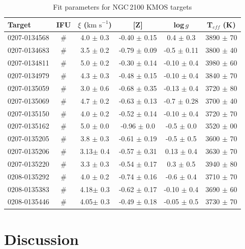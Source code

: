 \documentclass[useAMS,usenatbib]{mn2e}
\def\kms{$\mbox{km s}^{-1}$}
\begin{document}
\begin{table}
\begin{center}
\caption{
Fit parameters for NGC\,2100 KMOS targets
\label{tb:stellar-params}
         }
\scriptsize
\begin{tabular}{lc cccc}
 \hline
 \hline
  Target  & IFU & $\xi$ (\kms) & [Z] & log\,$g$ & T$_{eff}$ (K)\\
  \hline
0207-0134568 & \# & 4.0 $\pm$ 0.3 & -0.40 $\pm$ 0.15 &  0.4  $\pm$ 0.3  & 3890 $\pm$ 70\\
0207-0134683 & \# & 3.5 $\pm$ 0.2 & -0.79 $\pm$ 0.09 & -0.5  $\pm$ 0.11 & 3800 $\pm$ 40\\
0207-0134811 & \# & 5.0 $\pm$ 0.2 & -0.30 $\pm$ 0.14 & -0.10 $\pm$ 0.4  & 3980 $\pm$ 60\\
0207-0134979 & \# & 4.3 $\pm$ 0.3 & -0.48 $\pm$ 0.15 & -0.10 $\pm$ 0.4  & 3840 $\pm$ 70\\
0207-0135059 & \# & 3.0 $\pm$ 0.6 & -0.68 $\pm$ 0.35 & -0.13 $\pm$ 0.4  & 3720 $\pm$ 80\\
0207-0135069 & \# & 4.7 $\pm$ 0.2 & -0.63 $\pm$ 0.13 & -0.7  $\pm$ 0.28 & 3700 $\pm$ 40\\
0207-0135150 & \# & 4.0 $\pm$ 0.2 & -0.52 $\pm$ 0.14 & -0.10 $\pm$ 0.4  & 3720 $\pm$ 70\\
0207-0135162 & \# & 5.0 $\pm$ 0.0 & -0.96 $\pm$ 0.0  & -0.5  $\pm$ 0.0  & 3520 $\pm$ 00\\
0207-0135205 & \# & 3.8 $\pm$ 0.3 & -0.61 $\pm$ 0.19 & -0.5  $\pm$ 0.5  & 3600 $\pm$ 70\\
0207-0135206 & \# & 3.13$\pm$ 0.4 & -0.57 $\pm$ 0.31 &  0.13 $\pm$ 0.4  & 3630 $\pm$ 70\\
0207-0135220 & \# & 3.3 $\pm$ 0.3 & -0.54 $\pm$ 0.17 &  0.3  $\pm$ 0.5  & 3940 $\pm$ 80\\
0208-0135292 & \# & 4.0 $\pm$ 0.2 & -0.74 $\pm$ 0.16 & -0.6  $\pm$ 0.4  & 3710 $\pm$ 70\\
0208-0135383 & \# & 4.18$\pm$ 0.3 & -0.62 $\pm$ 0.17 & -0.10 $\pm$ 0.4  & 3690 $\pm$ 60\\
0208-0135446 & \# & 4.05$\pm$ 0.3 & -0.49 $\pm$ 0.18 & -0.05 $\pm$ 0.5  & 3730 $\pm$ 70\\

  \hline
  \end{tabular}
  \end{center}
\end{table}


\section{Discussion} %
\label{sec:discussion}
\end{document}
